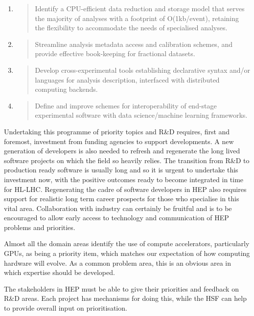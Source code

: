 \documentclass[11pt,a4paper]{article}
\begin{document}
\begin{enumerate}
\def\labelenumi{\arabic{enumi}.}
\item
  \begin{quote}
  Identify a CPU-efficient data reduction and storage model that serves
  the majority of analyses with a footprint of O(1kb/event), retaining
  the flexibility to accommodate the needs of specialised analyses.
  \end{quote}
\item
  \begin{quote}
  Streamline analysis metadata access and calibration schemes, and
  provide effective book-keeping for fractional datasets.
  \end{quote}
\item
  \begin{quote}
  Develop cross-experimental tools establishing declarative syntax
  and/or languages for analysis description, interfaced with distributed
  computing backends.
  \end{quote}
\item
  \begin{quote}
  Define and improve schemes for interoperability of end-stage
  experimental software with data science/machine learning frameworks.
  \end{quote}
\end{enumerate}

Undertaking this programme of priority topics and R\&D requires, first
and foremost, investment from funding agencies to support developments.
A new generation of developers is also needed to refresh and regenerate
the long lived software projects on which the field so heavily relies.
The transition from R\&D to production ready software is usually long
and so it is urgent to undertake this investment now, with the positive
outcomes ready to become integrated in time for HL-LHC. Regenerating the
cadre of software developers in HEP also requires support for realistic
long term career prospects for those who specialise in this vital area.
Collaboration with industry can certainly be fruitful and is to be
encouraged to allow early access to technology and communication of HEP
problems and priorities.

Almost all the domain areas identify the use of compute accelerators,
particularly GPUs, as being a priority item, which matches our
expectation of how computing hardware will evolve. As a common problem
area, this is an obvious area in which expertise should be developed.

The stakeholders in HEP must be able to give their priorities and
feedback on R\&D areas. Each project has mechanisms for doing this,
while the HSF can help to provide overall input on prioritisation.


\sloppy
\raggedright
\clearpage
\printbibliography[title={References},heading=bibintoc]
\end{document}
